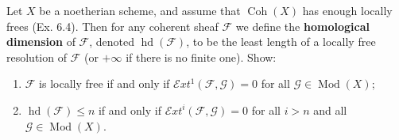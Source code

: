 Let $X$ be a noetherian scheme, and assume that $\operatorname{Coh}(X)$ has enough locally frees (Ex. 6.4). Then for any coherent sheaf $\mathcal{F}$ we define the \textbf{homological dimension} of $\mathcal{F}$, denoted $\operatorname{hd}(\mathcal{F})$, to be the least length of a locally free resolution of $\mathcal{F}$ (or $+\infty$ if there is no finite one). Show:

\begin{enumerate}
\item[(a)] $\mathcal{F}$ is locally free if and only if $\mathcal{E}xt^1(\mathcal{F}, \mathcal{G}) = 0$ for all $\mathcal{G} \in \operatorname{Mod}(X)$;
\item[(b)] $\operatorname{hd}(\mathcal{F}) \leq n$ if and only if $\mathcal{E}xt^i(\mathcal{F}, \mathcal{G}) = 0$ for all $i > n$ and all $\mathcal{G} \in \operatorname{Mod}(X)$.
\end{enumerate}
